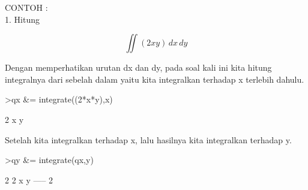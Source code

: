 \documentclass[a4paper,10pt]{article}
\begin{document}
\begin{eulernotebook}
\begin{eulercomment}
\begin{eulercomment}
\begin{eulercomment}
\begin{eulercomment}
\begin{eulercomment}
\begin{eulercomment}
\begin{eulercomment}
\begin{eulercomment}
\begin{eulercomment}
\begin{eulercomment}
\begin{eulercomment}
\begin{eulercomment}
\begin{eulercomment}
\begin{eulercomment}
\begin{eulercomment}
\begin{eulercomment}
\begin{eulercomment}
\begin{eulercomment}
\begin{eulercomment}
\begin{eulercomment}
\begin{eulercomment}
\begin{eulercomment}
\begin{eulercomment}
\begin{eulercomment}
\begin{eulercomment}
\begin{eulercomment}
\begin{eulercomment}
\begin{eulercomment}
\begin{eulercomment}
\begin{eulercomment}
\begin{eulercomment}
CONTOH :\\
1. Hitung\\
\end{eulercomment}
\begin{eulerformula}
\[
\iint (2xy) \, dx \, dy
\]
\end{eulerformula}
\begin{eulercomment}
Dengan memperhatikan urutan dx dan dy, pada soal kali ini kita hitung
integralnya dari sebelah dalam yaitu kita integralkan terhadap x
terlebih dahulu.
\end{eulercomment}
\begin{eulerprompt}
>qx &= integrate((2*x*y),x)
\end{eulerprompt}
\begin{euleroutput}
  
                                    2
                                   x  y
  
\end{euleroutput}
\begin{eulercomment}
Setelah kita integralkan terhadap x, lalu hasilnya kita integralkan
terhadap y.
\end{eulercomment}
\begin{eulerprompt}
>qy &= integrate(qx,y)
\end{eulerprompt}
\begin{euleroutput}
  
                                   2  2
                                  x  y
                                  -----
                                    2
  

\end{euleroutput}
\end{eulercomment}
\end{eulercomment}
\end{eulercomment}
\end{eulercomment}
\end{eulercomment}
\end{eulercomment}
\end{eulercomment}
\end{eulercomment}
\end{eulercomment}
\end{eulercomment}
\end{eulercomment}
\end{eulercomment}
\end{eulercomment}
\end{eulercomment}
\end{eulercomment}
\end{eulercomment}
\end{eulercomment}
\end{eulercomment}
\end{eulercomment}
\end{eulercomment}
\end{eulercomment}
\end{eulercomment}
\end{eulercomment}
\end{eulercomment}
\end{eulercomment}
\end{eulercomment}
\end{eulercomment}
\end{eulercomment}
\end{eulercomment}
\end{eulercomment}
\end{eulernotebook}
\end{document}
